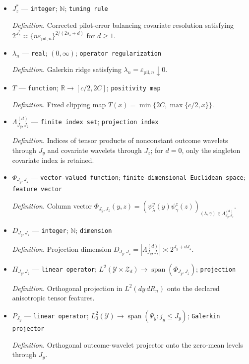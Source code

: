 \documentclass{article}
\begin{document}
\begin{itemize}
  \item \(J_z^*\) --- \texttt{integer}; \(\mathbb N\); \texttt{tuning rule}
  \par\smallskip\noindent\emph{Definition.} Corrected pilot-error balancing covariate resolution satisfying \(2^{J_z^*}\asymp\{n\varepsilon_{\mathrm{pil},n}\}^{2/(2s_z+d)}\) for \(d\ge1\).
  \item \(\lambda_n\) --- \texttt{real}; \((0,\infty)\); \texttt{operator regularization}
  \par\smallskip\noindent\emph{Definition.} Galerkin ridge satisfying \(\lambda_n=\varepsilon_{\mathrm{pil},n}\downarrow0\).
  \item \(T\) --- \texttt{function}; \(\mathbb R\to[c/2,2C]\); \texttt{positivity map}
  \par\smallskip\noindent\emph{Definition.} Fixed clipping map \(T(x)=\min\{2C,\max\{c/2,x\}\}\).
  \item \(\Lambda_{J_y,J_z}^{(d)}\) --- \texttt{finite index set}; \texttt{projection index}
  \par\smallskip\noindent\emph{Definition.} Indices of tensor products of nonconstant outcome wavelets through \(J_y\) and covariate wavelets through \(J_z\); for \(d=0\), only the singleton covariate index is retained.
  \item \(\Phi_{J_y,J_z}\) --- \texttt{vector-\allowbreak{}valued function}; \texttt{finite-\allowbreak{}dimensional Euclidean space}; \texttt{feature vector}
  \par\smallskip\noindent\emph{Definition.} Column vector \(\Phi_{J_y,J_z}(y,z)=(\psi^y_\lambda(y)\psi^z_\gamma(z))_{(\lambda,\gamma)\in\Lambda_{J_y,J_z}^{(d)}}\).
  \item \(D_{J_y,J_z}\) --- \texttt{integer}; \(\mathbb N\); \texttt{dimension}
  \par\smallskip\noindent\emph{Definition.} Projection dimension \(D_{J_y,J_z}=|\Lambda_{J_y,J_z}^{(d)}|\asymp2^{J_y+dJ_z}\).
  \item \(\Pi_{J_y,J_z}\) --- \texttt{linear operator}; \(L^2(\mathcal Y\times\mathcal Z_d)\to\operatorname{span}(\Phi_{J_y,J_z})\); \texttt{projection}
  \par\smallskip\noindent\emph{Definition.} Orthogonal projection in \(L^2(dy\,dR_n)\) onto the declared anisotropic tensor features.
  \item \(P_{J_y}\) --- \texttt{linear operator}; \(L_0^2(\mathcal Y)\to\operatorname{span}(\Psi_y:j_y\le J_y)\); \texttt{Galerkin projector}
  \par\smallskip\noindent\emph{Definition.} Orthogonal outcome-wavelet projector onto the zero-mean levels through \(J_y\).

\end{itemize}
\end{document}
